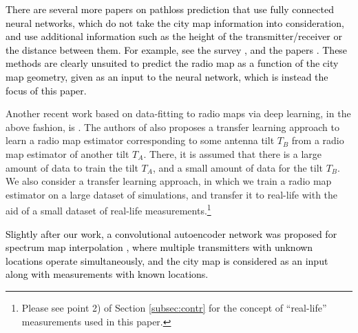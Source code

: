 \documentclass[10pt,a4paper]{article}
\begin{document}
 \textcolor{black}{There are several more papers on pathloss prediction that use fully connected neural networks, which do not take the city map information into consideration, and use additional information such as the height of the transmitter/receiver or the distance between them. For example, see the survey \cite{PopoolaSurvey}, and the papers \cite{SOTIROUDISOptimal, SOTIROUDISDiff, PopescuUrban}. These methods are clearly unsuited to 
 predict the radio map as a function of the city map geometry, given as an input to the neural network, which is instead  the focus of this paper.}
 
Another recent work based on data-fitting to radio maps via deep learning, in the above fashion, is \cite{TLTilting}. The authors of \cite{TLTilting} also proposes a transfer learning approach to learn a radio map estimator corresponding to some antenna tilt $T_B$ from a radio map estimator of another tilt $T_A$. There, it is assumed that there is a large amount of data to train the tilt $T_A$, and a small amount of data for the tilt $T_B$. We also consider a transfer learning approach, in which we train a radio map estimator on a large dataset of simulations, and transfer it to real-life with the aid of a small dataset of real-life measurements.\footnote{Please see point 2) of Section \ref{subsec:contr} for the concept of ``real-life'' measurements used in this paper.}

\textcolor{black}{Slightly after our work, a convolutional autoencoder network was proposed for spectrum map interpolation \cite{RomeroICC}, where multiple transmitters with unknown locations operate simultaneously, and the city map is considered as an input along with measurements with known locations.}

\end{document}

